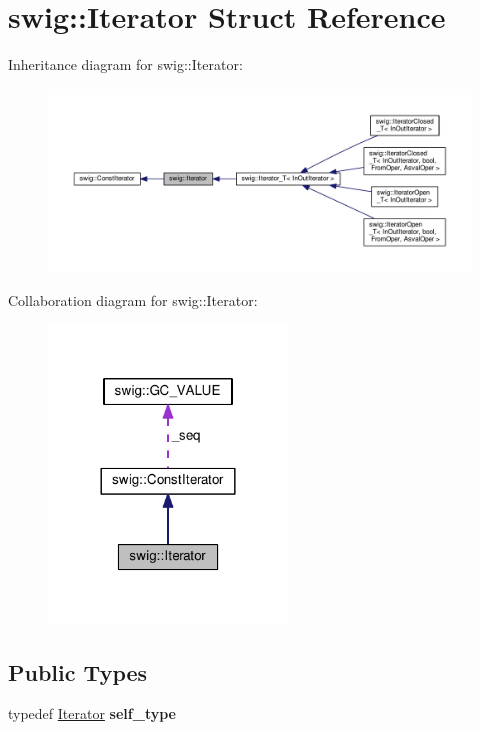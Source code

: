 \hypertarget{structswig_1_1Iterator}{}\section{swig\+:\+:Iterator Struct Reference}
\label{structswig_1_1Iterator}


Inheritance diagram for swig\+:\+:Iterator\+:
\nopagebreak
\begin{figure}[H]
\begin{center}
\leavevmode
\includegraphics[width=350pt]{structswig_1_1Iterator__inherit__graph}
\end{center}
\end{figure}


Collaboration diagram for swig\+:\+:Iterator\+:
\nopagebreak
\begin{figure}[H]
\begin{center}
\leavevmode
\includegraphics[width=180pt]{structswig_1_1Iterator__coll__graph}
\end{center}
\end{figure}
\subsection*{Public Types}
\begin{DoxyCompactItemize}
\item 
typedef \hyperlink{structswig_1_1Iterator}{Iterator} {\bfseries self\+\_\+type}\hypertarget{structswig_1_1Iterator_adec2f33054b92876bf8e67f54d6ad5c6}{}\label{structswig_1_1Iterator_adec2f33054b92876bf8e67f54d6ad5c6}

\end{DoxyCompactItemize}
